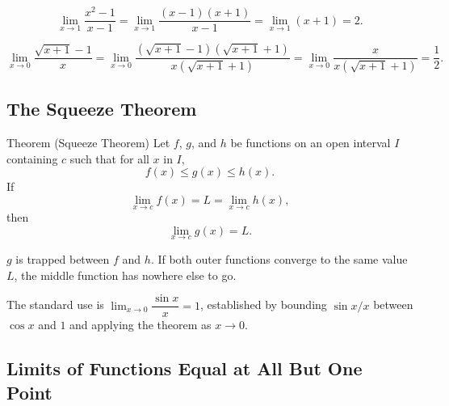 \begin{tcolorbox}[colback=gray!6, colframe=gray!40, arc=2pt,
  left=6pt, right=6pt, top=4pt, bottom=4pt,
  title={\small\textbf{Example: Factoring}},
  fonttitle=\small\bfseries]
\[
  \lim_{x \to 1} \frac{x^2 - 1}{x - 1}
  = \lim_{x \to 1} \frac{(x-1)(x+1)}{x-1}
  = \lim_{x \to 1} (x + 1)
  = 2.
\]
\end{tcolorbox}

\begin{tcolorbox}[colback=gray!6, colframe=gray!40, arc=2pt,
  left=6pt, right=6pt, top=4pt, bottom=4pt,
  title={\small\textbf{Example: Rationalising}},
  fonttitle=\small\bfseries]
\[
  \lim_{x \to 0} \frac{\sqrt{x+1} - 1}{x}
  = \lim_{x \to 0} \frac{(\sqrt{x+1} - 1)(\sqrt{x+1} + 1)}{x(\sqrt{x+1}+1)}
  = \lim_{x \to 0} \frac{x}{x(\sqrt{x+1}+1)}
  = \frac{1}{2}.
\]
\end{tcolorbox}


\subsection*{The Squeeze Theorem}

\begin{theorembox}{Theorem (Squeeze Theorem)}
Let $f$, $g$, and $h$ be functions on an open interval $I$
containing $c$ such that for all $x$ in $I$,
\[
  f(x) \leq g(x) \leq h(x).
\]
If
\[
  \lim_{x \to c} f(x) = L = \lim_{x \to c} h(x),
\]
then
\[
  \lim_{x \to c} g(x) = L.
\]
\end{theorembox}

\begin{remark*}[Intuition]
$g$ is trapped between $f$ and $h$.
If both outer functions converge to the same value $L$, the
middle function has nowhere else to go.
\end{remark*}

\begin{remark*}
The standard use is $\lim_{x \to 0} \dfrac{\sin x}{x} = 1$,
established by bounding $\sin x / x$ between $\cos x$ and $1$
and applying the theorem as $x \to 0$.
\end{remark*}

\subsection*{Limits of Functions Equal at All But One Point}

